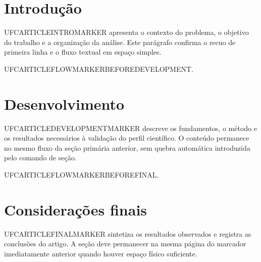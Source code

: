 \documentclass{abntexto-ufc}
\date{18 de agosto de 2026}
\begin{document}
\pretextual

\ufcPrintCover
\ufcPrintTitlePage
\ufcPrintApprovalPage
{}
\ufcPrintTableOfContents

\textual
\section{Introdução}
UFCARTICLEINTROMARKER apresenta o contexto do problema, o objetivo do trabalho e a organização da análise. Este parágrafo confirma o recuo de primeira linha e o fluxo textual em espaço simples.

\newpage
UFCARTICLEFLOWMARKERBEFOREDEVELOPMENT.
\section{Desenvolvimento}
UFCARTICLEDEVELOPMENTMARKER descreve os fundamentos, o método e os resultados necessários à validação do perfil científico. O conteúdo permanece no mesmo fluxo da seção primária anterior, sem quebra automática introduzida pelo comando de seção.

UFCARTICLEFLOWMARKERBEFOREFINAL.
\section{Considerações finais}
UFCARTICLEFINALMARKER sintetiza os resultados observados e registra as conclusões do artigo. A seção deve permanecer na mesma página do marcador imediatamente anterior quando houver espaço físico suficiente.

\nocite{silva2020}
\ufcPrintReferences
\end{document}
